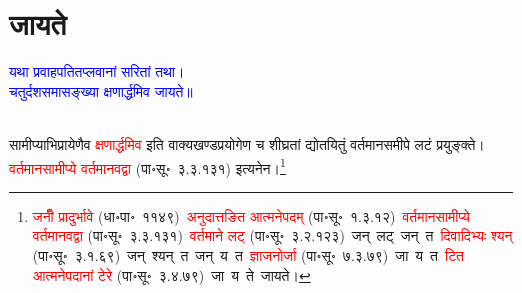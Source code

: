 \section[जायते]{जायते}
\centering\textcolor{blue}{यथा प्रवाहपतितप्लवानां सरितां तथा।\nopagebreak\\
चतुर्दशसमासङ्ख्या क्षणार्द्धमिव जायते॥}\nopagebreak\\
\\
\fontsize{14}{21}\selectfont\begin{sloppypar}\justifying\noindent\hspace{10mm} सामीप्याभिप्रायेणैव \textcolor{red}{क्षणार्द्धमिव} इति वाक्य\-खण्ड\-प्रयोगेण च शीघ्रतां द्योतयितुं वर्तमान\-समीपे लटं प्रयुङ्क्ते। \textcolor{red}{वर्तमान\-सामीप्ये वर्तमानवद्वा} (पा॰सू॰~३.३.१३१) इत्यनेन।\footnote{\textcolor{red}{जनीँ प्रादुर्भावे} (धा॰पा॰~११४९)~\arrow \textcolor{red}{अनुदात्तङित आत्मने\-पदम्} (पा॰सू॰~१.३.१२)~\arrow \textcolor{red}{वर्तमान\-सामीप्ये वर्तमानवद्वा} (पा॰सू॰~३.३.१३१)~\arrow \textcolor{red}{वर्तमाने लट्} (पा॰सू॰~३.२.१२३)~\arrow जन्~लट्~\arrow जन्~त~\arrow \textcolor{red}{दिवादिभ्यः श्यन्} (पा॰सू॰~३.१.६९)~\arrow जन्~श्यन्~त~\arrow जन्~य~त~\arrow \textcolor{red}{ज्ञाजनोर्जा} (पा॰सू॰~७.३.७९)~\arrow जा~य~त~\arrow \textcolor{red}{टित आत्मनेपदानां टेरे} (पा॰सू॰~३.४.७९)~\arrow जा~य~ते~\arrow जायते।}\end{sloppypar}
